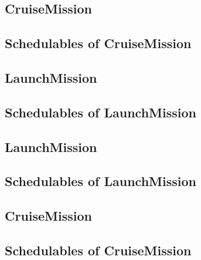\documentclass[10pt,a4paper]{article}
\begin{document}
\subsection{CruiseMission}

\newpage

\subsection{Schedulables of CruiseMission}


\newpage


\newpage


\newpage


\subsection{LaunchMission}

\newpage

\subsection{Schedulables of LaunchMission}


\newpage


\subsection{LaunchMission}

\newpage

\subsection{Schedulables of LaunchMission}


\newpage


\subsection{CruiseMission}

\newpage

\subsection{Schedulables of CruiseMission}


\newpage
\end{document}
